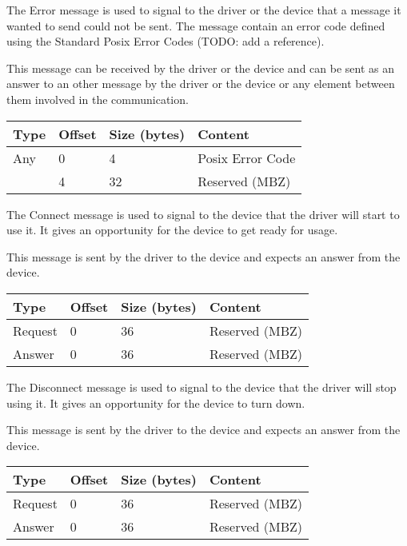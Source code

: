 
The Error message is used to signal to the driver or the device that a message
it wanted to send could not be sent. The message contain an error code defined
using the Standard Posix Error Codes (TODO: add a reference).

This message can be received by the driver or the device and can be sent as an
answer to an other message by the driver or the device or any element between
them involved in the communication.

\begin{tabular}{|l|l|l|l|}
\hline
Type & Offset & Size (bytes) & Content \\
\hline \hline
Any     & 0 & 4 & Posix Error Code \\
        & 4 & 32 & Reserved (MBZ) \\
\hline
\end{tabular}


The Connect message is used to signal to the device that the driver will start
to use it. It gives an opportunity for the device to get ready for usage.

This message is sent by the driver to the device and expects an answer from the
device.

\begin{tabular}{|l|l|l|l|}
\hline
Type & Offset & Size (bytes) & Content \\
\hline \hline
Request & 0 & 36 & Reserved (MBZ) \\
\hline
Answer & 0 & 36 & Reserved (MBZ) \\
\hline
\end{tabular}


The Disconnect message is used to signal to the device that the driver will
stop using it. It gives an opportunity for the device to turn down.

This message is sent by the driver to the device and expects an answer from the
device.

\begin{tabular}{|l|l|l|l|}
\hline
Type & Offset & Size (bytes) & Content \\
\hline \hline
Request & 0 & 36 & Reserved (MBZ) \\
\hline
Answer & 0 & 36 & Reserved (MBZ) \\
\hline
\end{tabular}


